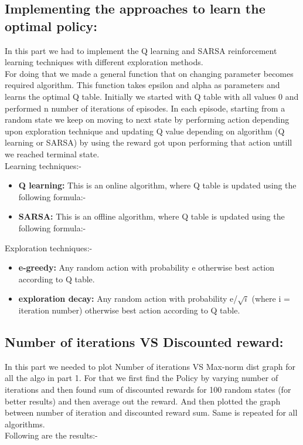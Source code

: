 \documentclass{article}
\begin{document}
\begin{enumerate}[a)]
\subsection{Implementing the approaches to learn the optimal policy:}
In this part we had to implement the Q learning and SARSA reinforcement learning techniques with different exploration methods.\\
For doing that we made a general function that on changing parameter becomes required algorithm. This function takes epsilon and alpha as
parameters and learns the optimal Q table. Initially we started with Q table with all values 0 and performed n number of iterations of episodes. In 
each episode, starting from a random state we keep on moving to next state by performing action depending upon exploration technique and updating Q value depending on
algorithm (Q learning or SARSA) by using the reward got upon performing that action untill we reached terminal state. \\

Learning techniques:- 
\begin{itemize}
    \item \textbf{Q learning: }  This is an online algorithm, where Q table is updated using the following formula:- 
        $ $
    \item \textbf{SARSA: }  This is an offline algorithm, where Q table is updated using the following formula:- 
        $ $
\end{itemize}

Exploration techniques:- 
\begin{itemize}
    \item \textbf{e-greedy: } Any random action with probability e otherwise best action according to Q table.
    \item \textbf{exploration decay: } Any random action with probability e/$\sqrt{i}$ (where i = iteration number) otherwise best action according to Q table.
\end{itemize}


\subsection{Number of iterations VS Discounted reward:}
In this part we needed to plot Number of iterations VS Max-norm dist graph for all the algo in part 1. For that we first find the Policy by varying number of iterations and then found 
sum of discounted rewards for 100 random states (for better results) and then average out the reward. And then plotted the graph between number of iteration and discounted reward sum. Same is repeated for all algorithms.\\
Following are the results:-



\end{enumerate}
\end{document}
